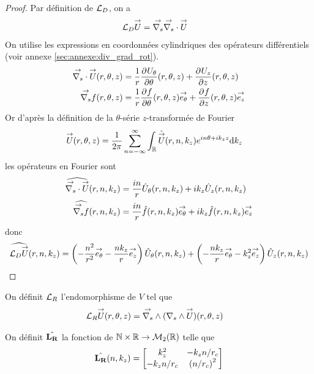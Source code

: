     \begin{proof}
      Par définition de \(\LD\), on a
      \begin{align*}
        \LD \vect{U} & = \vgrads{} \vdivs{} \vect{U}
      \end{align*}
      On utilise les expressions en coordonnées cylindriques des opérateurs différentiels (voir annexe \ref{sec:annexe:div_grad_rot}).
      \begin{align*}
        \vdivs{\vect{U}}(r,\theta,z) &= \frac{1}{r}\ddr{\theta}{U_\theta}(r,\theta,z) + \ddr{z}{U_z}(r,\theta,z)
        \\
        \vgrads{f}(r,\theta,z) &= \frac{1}{r}\ddr{\theta}{f}(r,\theta,z)\vect{e_\theta} + \ddr{z}{f}(r,\theta,z)\vect{e_z}
      \end{align*}
      Or d’après la définition de la \(\theta\)-série \(z\)-transformée de Fourier
      \begin{align*}
        \vect{U}(r,\theta,z) & = \frac{1}{2\pi}\sum_{n=-\infty}^\infty \int_\RR \hat{\vect{U}}(r,n,k_z)e^{in\theta + ik_zz}\dd{k_z}
      \end{align*}
      les opérateurs en Fourier sont
      \begin{align*}
        \widehat{\vdivs{\vect{U}}}(r,n,k_z) &= \frac{in}{r}{\hat{U}_\theta}(r,n,k_z) + ik_z{\hat{U}_z}(r,n,k_z)
        \\
        \widehat{\vgrads{f}}(r,n,k_z) &= \frac{in}{r}\hat{f}(r,n,k_z)\vect{e_\theta} + ik_z\hat{f}(r,n,k_z)\vect{e_z}
      \end{align*}
      donc
      \begin{align*}
        \widehat{\LD{\vect{U}}}(r,n,k_z) =  \left(-\frac{n^2}{r^2}\vect{e_\theta} - \frac{nk_z}{r}\vect{e_z}\right){\hat{U}_\theta}(r,n,k_z) + \left(-\frac{nk_z}{r}\vect{e_\theta} - {k_z^2}\vect{e_z}\right){\hat{U}_z}(r,n,k_z)
      \end{align*}

    \end{proof}


    \begin{defn}
      \label{eq:cylindre:fourier:LR}

      On définit \(\LR\) l'endomorphisme de \(V\) tel que
      \begin{align*}
        \LR \vect{U}(r,\theta,z) & = \vrots{} (\rots{} \vect{U})(r,\theta,z)
      \end{align*}

      On définit \(\hat{\mLR}\) la fonction de \(\NN\times\RR \rightarrow \mathcal{M}_2(\RR)\) telle que
      \begin{equation*}
        \hat{\mLR}(n,k_z) = 
        \begin{bmatrix}
          k_z^2 & -k_z{n}\slash{r_c}
          \\
          -k_z{n}\slash{r_c} & \left({n}\slash{r_c}\right)^2
        \end{bmatrix}
      \end{equation*}
    \end{defn}


